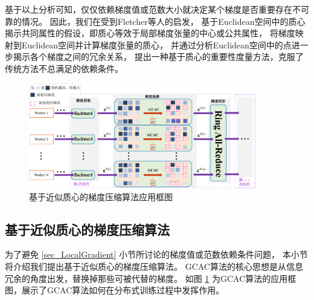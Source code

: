 \documentclass{xdupgthesis}
\begin{document}
基于以上分析可知，仅仅依赖梯度值或范数大小就决定某个梯度是否重要存在不可靠的情况。
因此，我们在受到Fletcher等人\cite{fletcher2008robust}的启发，
基于Euclidean空间中的质心揭示共同属性的假设，即质心等效于局部梯度张量的中心或公共属性，
将梯度映射到Euclidean空间并计算梯度张量的质心，
并通过分析Euclidean空间中的点进一步揭示各个梯度之间的冗余关系，
提出一种基于质心的重要性度量方法，克服了传统方法不总满足的依赖条件。

\begin{figure}[ht]
    \centering
    \includegraphics[width=0.884\textwidth]{GCC-Outline.pdf}
    \caption{基于近似质心的梯度压缩算法应用框图}
    \label{fig_GCC-Outline}
\end{figure}
\subsection{基于近似质心的梯度压缩算法}
为了避免 \ref{sec_LocalGradient} 小节所讨论的梯度值或范数依赖条件问题，
本小节将介绍我们提出基于近似质心的梯度压缩算法。
GCAC算法的核心思想是从信息冗余的角度出发，替换掉那些可被代替的梯度。
如图 \ref{fig_GCC-Outline} 为GCAC算法的应用框图，展示了GCAC算法如何在分布式训练过程中发挥作用。
\end{document}
